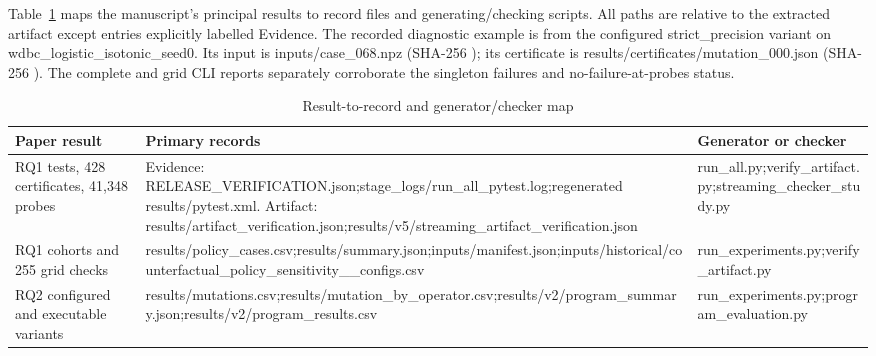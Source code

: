 \documentclass[11pt,a4paper]{article}
\theoremstyle{plain}
\theoremstyle{definition}
\theoremstyle{remark}
\begin{document}
Table~\ref{tab:s14} maps the manuscript's principal results to record files and generating/checking scripts. All paths are relative to the extracted artifact except entries explicitly labelled Evidence. The recorded diagnostic example is from the configured strict\_precision variant on wdbc\_logistic\_isotonic\_seed0. Its input is inputs/case\_068.npz (SHA-256 \texttt{}); its certificate is results/certificates/mutation\_000.json (SHA-256 \texttt{}). The complete and grid CLI reports separately corroborate the singleton failures and no-failure-at-probes status.

\begin{table}[!htbp]
\caption{Result-to-record and generator/checker map}\label{tab:s14}
\centering
\footnotesize
\setlength{\tabcolsep}{3pt}
\renewcommand{\arraystretch}{1.15}
\begin{tabularx}{\textwidth}{@{} >{\raggedright\arraybackslash}p{3.2cm} >{\raggedright\arraybackslash}X >{\raggedright\arraybackslash}p{3.6cm} @{}}
\toprule
\textbf{Paper result} & \textbf{Primary records} & \textbf{Generator or checker} \\
\midrule
RQ1 tests, 428 certificates, 41{,}348 probes & Evidence: RELEASE\_\allowbreak VERIFICATION.json;\allowbreak  stage\_\allowbreak logs/\allowbreak run\_\allowbreak all\_\allowbreak pytest.log;\allowbreak  regenerated results/\allowbreak pytest.xml. Artifact: results/\allowbreak artifact\_\allowbreak verification.json;\allowbreak  results/\allowbreak v5/\allowbreak streaming\_\allowbreak artifact\_\allowbreak verification.json & run\_\allowbreak all.py;\allowbreak  verify\_\allowbreak artifact.py;\allowbreak  streaming\_\allowbreak checker\_\allowbreak study.py \\
RQ1 cohorts and 255 grid checks & results/\allowbreak policy\_\allowbreak cases.csv;\allowbreak  results/\allowbreak summary.json;\allowbreak  inputs/\allowbreak manifest.json;\allowbreak  inputs/\allowbreak historical/\allowbreak counterfactual\_\allowbreak policy\_\allowbreak sensitivity\_\allowbreak 255\_\allowbreak configs.csv & run\_\allowbreak experiments.py;\allowbreak  verify\_\allowbreak artifact.py \\
RQ2 configured and executable variants & results/\allowbreak mutations.csv;\allowbreak  results/\allowbreak mutation\_\allowbreak by\_\allowbreak operator.csv;\allowbreak  results/\allowbreak v2/\allowbreak program\_\allowbreak summary.json;\allowbreak  results/\allowbreak v2/\allowbreak program\_\allowbreak results.csv & run\_\allowbreak experiments.py;\allowbreak  program\_\allowbreak evaluation.py \\

\end{tabularx}
\end{table}
\end{document}
